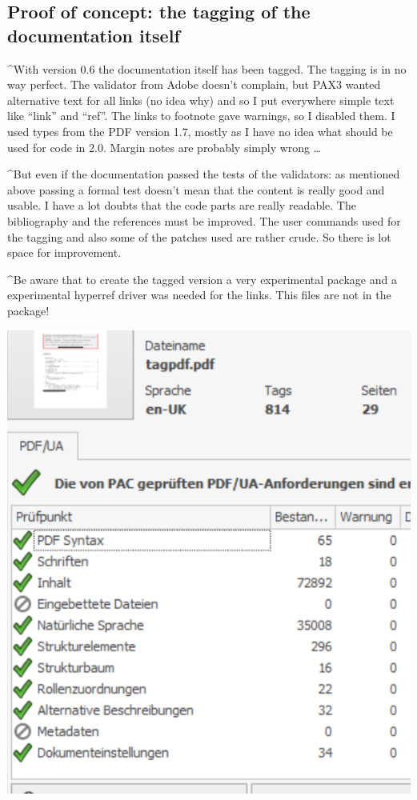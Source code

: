 \documentclass[DIV=12,parskip=half-,bibliography=totoc]{scrartcl}
\newcommand\PDF{PDF}
\begin{document}
\subsection{Proof of concept: the tagging of the documentation itself}
\TagP^With version 0.6 the documentation itself has been tagged. The tagging is in no way perfect. The validator from Adobe doesn't complain, but PAX3 wanted alternative text for all links (no idea why) and so I put everywhere simple text like \enquote{link} and \enquote{ref}. The links to footnote gave warnings, so I disabled them. I used types from the \PDF{} version 1.7, mostly as I have no idea what should be used for code in 2.0. Margin notes are probably simply wrong \ldots\TagPend

\TagP^But even if the documentation passed the tests of the validators:  as mentioned above passing a formal test doesn't mean that the content is really good and usable. I have a lot doubts that the code parts are really readable. The bibliography and the references must be improved. The user commands used for the tagging and also some of the patches used are rather crude. So there is lot space for improvement.\TagPend

\begin{tcolorbox}
\TagP^Be aware that to create the tagged version a very experimental package and a experimental hyperref driver was needed for the links. This files are not in the package!\TagPend
\end{tcolorbox}

\includegraphics{pac3}
\tagmcend\tagstructend
\end{document}
